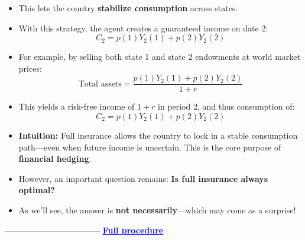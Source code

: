 \documentclass[12pt]{article}
\begin{document}
\begin{itemize}
\item This lets the country \textbf{stabilize consumption} across states.

\item With this strategy, the agent creates a guaranteed income on date 2:
\[
C_2 = p(1)Y_2(1) + p(2)Y_2(2)
\]

\item For example, by selling both state 1 and state 2 endowments at world market prices:
\[
\text{Total assets} = \frac{p(1)Y_2(1) + p(2)Y_2(2)}{1 + r}
\]

\item This yields a risk-free income of $1 + r$ in period 2, and thus consumption of:
\[
C_2 = p(1)Y_2(1) + p(2)Y_2(2)
\]

\item \textbf{Intuition:} Full insurance allows the country to lock in a stable consumption path—even when future income is uncertain. This is the core purpose of \textbf{financial hedging}.

\item However, an important question remains: \textbf{Is full insurance always optimal?}

\item As we’ll see, the answer is \textbf{not necessarily}—which may come as a surprise!
\end{itemize}


-----------------------------------
\vspace{.3cm}
\textcolor{blue}{\textbf{\uline{Full procedure}}}
\end{document}
